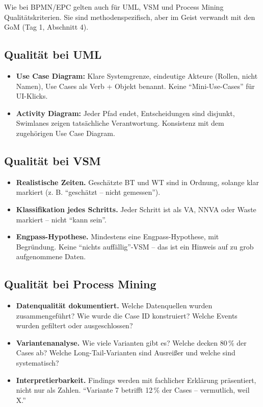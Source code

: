 \documentclass[11pt,a4paper,oneside]{article}
\begin{document}
Wie bei BPMN/EPC gelten auch für UML, VSM und Process Mining Qualitätskriterien. Sie sind methodenspezifisch, aber im Geist verwandt mit den GoM (Tag 1, Abschnitt 4).

\subsection{Qualität bei UML}

\begin{itemize}
  \item \textbf{Use Case Diagram:} Klare Systemgrenze, eindeutige Akteure (Rollen, nicht Namen), Use Cases als Verb + Objekt benannt. Keine ``Mini-Use-Cases'' für UI-Klicks.
  \item \textbf{Activity Diagram:} Jeder Pfad endet, Entscheidungen sind disjunkt, Swimlanes zeigen tatsächliche Verantwortung. Konsistenz mit dem zugehörigen Use Case Diagram.
\end{itemize}

\subsection{Qualität bei VSM}

\begin{itemize}
  \item \textbf{Realistische Zeiten.} Geschätzte BT und WT sind in Ordnung, solange klar markiert (z. B. ``geschätzt -- nicht gemessen'').
  \item \textbf{Klassifikation jedes Schritts.} Jeder Schritt ist als VA, NNVA oder Waste markiert -- nicht ``kann sein''.
  \item \textbf{Engpass-Hypothese.} Mindestens eine Engpass-Hypothese, mit Begründung. Keine ``nichts auffällig''-VSM -- das ist ein Hinweis auf zu grob aufgenommene Daten.
\end{itemize}

\subsection{Qualität bei Process Mining}

\begin{itemize}
  \item \textbf{Datenqualität dokumentiert.} Welche Datenquellen wurden zusammengeführt? Wie wurde die Case ID konstruiert? Welche Events wurden gefiltert oder ausgeschlossen?
  \item \textbf{Variantenanalyse.} Wie viele Varianten gibt es? Welche decken 80\,\% der Cases ab? Welche Long-Tail-Varianten sind Ausreißer und welche sind systematisch?
  \item \textbf{Interpretierbarkeit.} Findings werden mit fachlicher Erklärung präsentiert, nicht nur als Zahlen. ``Variante 7 betrifft 12\,\% der Cases -- vermutlich, weil X.''
\end{itemize}
\end{document}
